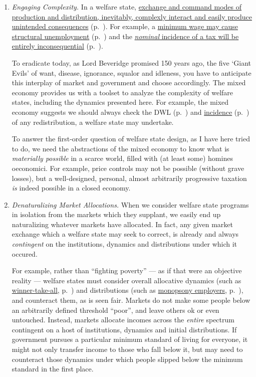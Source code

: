 \begin{enumerate}
	\item \emph{Engaging Complexity.}
	In a welfare state, \hyperref[sec:interface]{exchange and command modes of production and distribution, inevitably, complexly interact and easily produce unintended consequences} (p.~\pageref{sec:interface}).
	For example, a \hyperref[sec:prince-controls]{minimum wage may cause structural unemployment} (p.~\pageref{sec:price-controls}) and the \hyperref[sec:well-determined-incidence]{\emph{nominal} incidence of a tax will be entirely inconsequential} (p.~\pageref{sec:well-determined-incidence}).

	To eradicate today, as Lord Beveridge promised 150 years ago, the five `Giant Evils' of want, disease, ignorance, squalor and idleness, you have to anticipate this interplay of market and government and choose accordingly.
	The mixed economy provides us with a toolset to analyze the complexity of welfare states, including the dynamics presented here.
	For example, the mixed economy suggests we should always check the \gls{DWL} (p.~\pageref{sec:minimal-DWL}) and \hyperref[sec:well-determined-incidence]{incidence} (p.~\pageref{sec:well-determined-incidence}) of any redistribution, a welfare state may undertake.

	To answer the first-order question of welfare state design, as I have here tried to do, we need the abstractions of the mixed economy to know what is \emph{materially possible} in a scarce world, filled with (at least some) homines oeconomici.
	For example, price controls may not be possible (without grave losses), but a well-designed, personal, almost arbitrarily progressive taxation \emph{is} indeed possible in a closed economy.

	\item \emph{Denaturalizing Market Allocations.}
	When we consider welfare state programs in isolation from the markets which they supplant, we easily end up naturalizing whatever markets have allocated.
	In fact, any given market exchange which a welfare state may seek to correct, is already and always \emph{contingent} on the institutions, dynamics and distributions under which it occured.

	For example, rather than ``fighting poverty'' --- as if that were an objective reality --- welfare states must consider overall allocative dynamics (such as \hyperref[sec:winner-take-all]{winner-take-all}, p.~\pageref{sec:winner-take-all}) and distributions (such as \hyperref[sec:monopsony-employers]{monopsony employers}, p.~\pageref{sec:monopsony-employers}), and counteract them, as is seen fair.
	Markets do not make some people below an arbitrarily defined threshold ``poor'', and leave others ok or even untouched.
	Instead, markets allocate incomes across the \emph{entire} spectrum contingent on a host of institutions, dynamics and initial distributions.
	If government pursues a particular minimum standard of living for everyone, it might not only transfer income to those who fall below it, but may need to counteract those dynamics under which people slipped below the minimum standard in the first place.


\end{enumerate}
